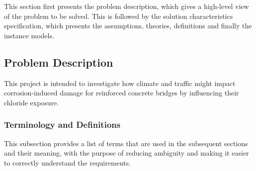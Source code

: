 \documentclass[12pt]{article}
\begin{document}
This section first presents the problem description, which gives a high-level
view of the problem to be solved.  This is followed by the solution characteristics
specification, which presents the assumptions, theories, definitions and finally
the instance models.  

\subsection{Problem Description} \label{Sec_pd}
This project is intended to investigate how climate and traffic might impact corrosion-induced damage for reinforced concrete bridges by influencing their chloride exposure.

\subsubsection{Terminology and  Definitions}
This subsection provides a list of terms that are used in the subsequent
sections and their meaning, with the purpose of reducing ambiguity and making it
easier to correctly understand the requirements.
\end{document}
